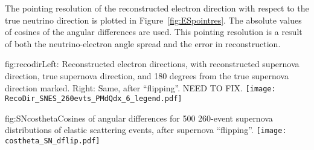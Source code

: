 The pointing resolution of the reconstructed electron direction with respect to the true neutrino direction is plotted in Figure~\ref{fig:ESpointres}. The absolute values of cosines of the angular differences are used. This pointing resolution is a result of both the neutrino-electron angle spread and the error in reconstruction.






\begin{dunefigure}{fig:recodir}{Left: Reconstructed
    electron directions, with reconstructed supernova direction, true
    supernova direction, and 180 degrees from the true supernova
    direction marked. Right: Same, after ``flipping''. NEED TO FIX.}
\texttt{[image: RecoDir\_SNES\_260evts\_PMdQdx\_6\_legend.pdf]}
\end{dunefigure}




\begin{dunefigure}{fig:SNcostheta}{Cosines of angular differences for 500
    260-event supernova distributions of elastic scattering events,
    after supernova ``flipping''.}
  \texttt{[image: costheta\_SN\_dflip.pdf]}
\end{dunefigure}

